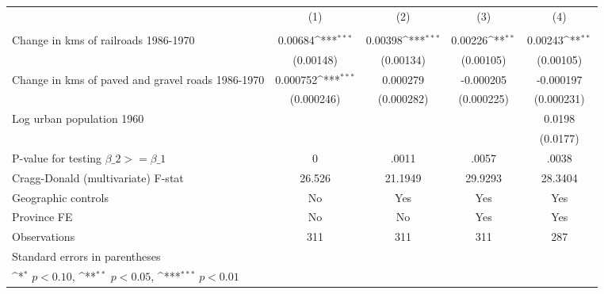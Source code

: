 {
\def\sym#1{\ifmmode^{#1}\else\(^{#1}\)\fi}
\begin{tabular}{l*{4}{c}}
\hline\hline
                &\multicolumn{1}{c}{(1)}&\multicolumn{1}{c}{(2)}&\multicolumn{1}{c}{(3)}&\multicolumn{1}{c}{(4)}\\
                &\multicolumn{1}{c}{}&\multicolumn{1}{c}{}&\multicolumn{1}{c}{}&\multicolumn{1}{c}{}\\
\hline
Change in kms of railroads 1986-1970&  0.00684\sym{***}&  0.00398\sym{***}&  0.00226\sym{**} &  0.00243\sym{**} \\
                &(0.00148)         &(0.00134)         &(0.00105)         &(0.00105)         \\
[1em]
Change in kms of paved and gravel roads 1986-1970& 0.000752\sym{***}& 0.000279         &-0.000205         &-0.000197         \\
                &(0.000246)         &(0.000282)         &(0.000225)         &(0.000231)         \\
[1em]
Log urban population 1960&                  &                  &                  &   0.0198         \\
                &                  &                  &                  & (0.0177)         \\
\hline
P-value for testing $\beta\_{2} >= \beta\_{1}$&        0         &    .0011         &    .0057         &    .0038         \\
Cragg-Donald (multivariate) F-stat&   26.526         &  21.1949         &  29.9293         &  28.3404         \\
Geographic controls&       No         &      Yes         &      Yes         &      Yes         \\
Province FE     &       No         &       No         &      Yes         &      Yes         \\
Observations    &      311         &      311         &      311         &      287         \\
\hline\hline
\multicolumn{5}{l}{\footnotesize Standard errors in parentheses}\\
\multicolumn{5}{l}{\footnotesize \sym{*} \(p<0.10\), \sym{**} \(p<0.05\), \sym{***} \(p<0.01\)}\\
\end{tabular}
}
